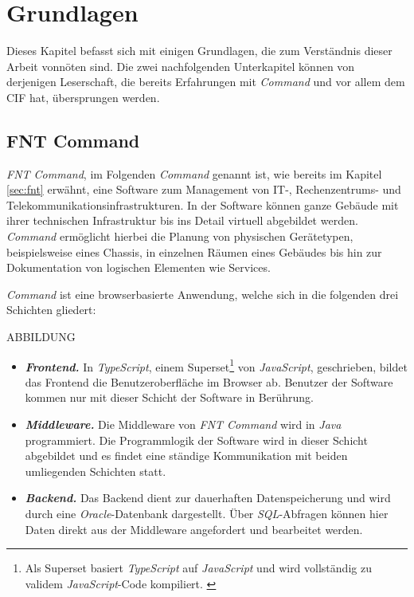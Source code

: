 
\chapter{Grundlagen}\label{ch:grundlagen}
Dieses Kapitel befasst sich mit einigen Grundlagen, die zum Verständnis dieser Arbeit vonnöten sind. Die zwei nachfolgenden Unterkapitel können von derjenigen Leserschaft, die bereits Erfahrungen mit \textit{Command} und vor allem dem \ac{CIF} hat, übersprungen werden.

\section{FNT Command}\label{sec:command}
\textit{FNT Command}, im Folgenden \textit{Command} genannt ist, wie bereits im Kapitel \ref{sec:fnt} erwähnt, eine Software zum Management von IT-, Rechenzentrums- und Telekommunikationsinfrastrukturen. In der Software können ganze Gebäude mit ihrer technischen Infrastruktur bis ins Detail virtuell abgebildet werden. \textit{Command} ermöglicht hierbei die Planung von physischen Gerätetypen, beispielsweise eines Chassis, in einzelnen Räumen eines Gebäudes bis hin zur Dokumentation von logischen Elementen wie Services.

\textit{Command} ist eine browserbasierte Anwendung, welche sich in die folgenden drei Schichten gliedert:

ABBILDUNG

\begin{itemize}
    \item \textit{\textbf{Frontend.}} In \textit{TypeScript}, einem Superset\footnote{Als Superset basiert \textit{TypeScript} auf \textit{JavaScript} und wird vollständig zu validem \textit{JavaScript}-Code kompiliert. \cite{ts:2021}} von \textit{JavaScript}, geschrieben, bildet das Frontend die Benutzeroberfläche im Browser ab. Benutzer der Software kommen nur mit dieser Schicht der Software in Berührung.
    \item \textit{\textbf{Middleware.}} Die Middleware von \textit{FNT Command} wird in \textit{Java} programmiert. Die Programmlogik der Software wird in dieser Schicht abgebildet und es findet eine ständige Kommunikation mit beiden umliegenden Schichten statt.
    \item \textit{\textbf{Backend.}} Das Backend dient zur dauerhaften Datenspeicherung und wird durch eine \textit{Oracle}-Datenbank dargestellt. Über \textit{\ac{SQL}}-Abfragen können hier Daten direkt aus der Middleware angefordert und bearbeitet werden.
\end{itemize}

